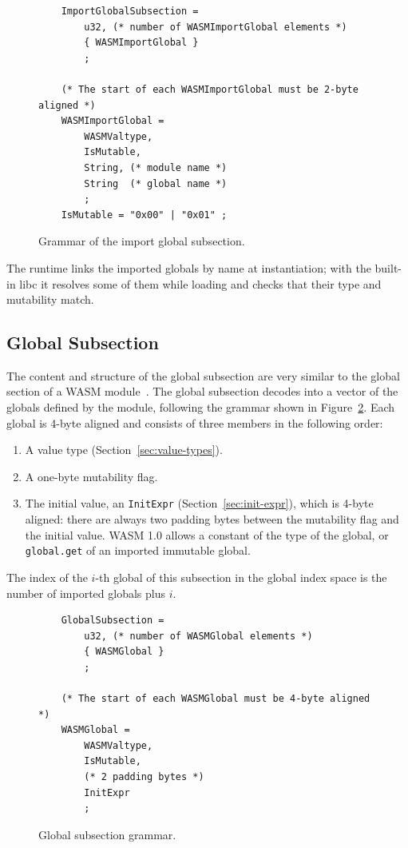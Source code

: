 \documentclass{article}
\begin{document}
\begin{figure}[H]
\begin{verbatim}
    ImportGlobalSubsection =
        u32, (* number of WASMImportGlobal elements *)
        { WASMImportGlobal }
        ;

    (* The start of each WASMImportGlobal must be 2-byte aligned *)
    WASMImportGlobal =
        WASMValtype,
        IsMutable,
        String, (* module name *)
        String  (* global name *)
        ;
    IsMutable = "0x00" | "0x01" ;
\end{verbatim}
\caption{Grammar of the import global subsection.}
\label{fig:import-global-subsection-grammar}
\end{figure}

The runtime links the imported globals by name at instantiation; with the built-in libc it resolves some of them while loading and checks that their type and mutability match.

\subsection{Global Subsection}
The content and structure of the global subsection are very similar to the global section of a WASM module~\cite[Sec.~5.5.9]{webassembly2019core}.
The global subsection decodes into a vector of the globals defined by the module, following the grammar shown in Figure~\ref{fig:global-subsection-grammar}.
Each global is 4-byte aligned and consists of three members in the following order:
\begin{enumerate}
    \item A value type (Section~\ref{sec:value-types}).
    \item A one-byte mutability flag.
    \item The initial value, an \verb|InitExpr| (Section~\ref{sec:init-expr}), which is 4-byte aligned: there are always two padding bytes between the mutability flag and the initial value.
        WASM 1.0 allows a constant of the type of the global, or \verb|global.get| of an imported immutable global.
\end{enumerate}
The index of the $i$-th global of this subsection in the global index space is the number of imported globals plus $i$.

\begin{figure}[H]
\begin{verbatim}
    GlobalSubsection =
        u32, (* number of WASMGlobal elements *)
        { WASMGlobal }
        ;

    (* The start of each WASMGlobal must be 4-byte aligned *)
    WASMGlobal =
        WASMValtype,
        IsMutable,
        (* 2 padding bytes *)
        InitExpr
        ;
\end{verbatim}
\caption{Global subsection grammar.}
\label{fig:global-subsection-grammar}
\end{figure}
\end{document}
